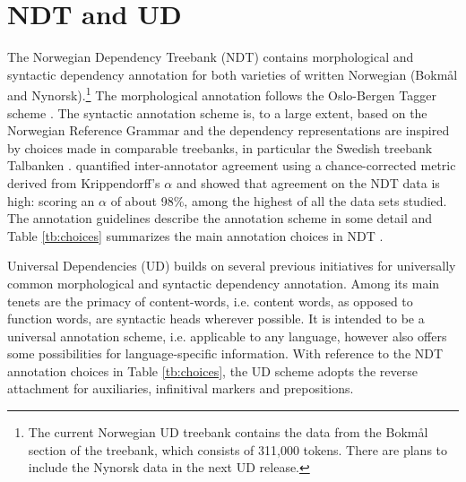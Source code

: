 \documentclass[10pt, a4paper]{article}
\begin{document}
\section{NDT and UD}
The Norwegian Dependency Treebank (NDT) \cite{Sol:Skj:Ovr:14} contains
morphological and syntactic dependency annotation for both varieties
of written Norwegian (Bokm{\aa}l and Nynorsk).\footnote{The current
  Norwegian UD treebank contains the data from the Bokmål section of
  the treebank, which consists of 311,000 tokens. There are plans to
  include the Nynorsk data in the next UD release.} The morphological
annotation follows the Oslo-Bergen Tagger scheme
\cite{Hag:Joh:Nok:00}.  The syntactic annotation scheme is, to a large
extent, based on the Norwegian Reference Grammar
\cite{Faa:Lie:Van:97} and the dependency representations are
inspired by choices made in comparable treebanks, in particular the
Swedish treebank Talbanken \cite{Niv:Nil:Hal:2006}.
 quantified inter-annotator agreement using a chance-corrected metric derived from
Krippendorff's $\alpha$ and showed that agreement on the NDT data is high: scoring an $\alpha$ of about
98\%, among the highest of all the data sets studied.
The annotation guidelines \cite{Kin:Sol:Eri:2013} describe the annotation scheme in some detail and Table \ref{tb:choices} summarizes the main annotation choices in NDT \cite{Sol:Skj:Ovr:14}.


Universal Dependencies (UD) builds on several previous initiatives for
universally common morphological \cite{Zem:08,Pet:Das:McD:12} and
syntactic dependency \cite{McD:Niv:Qui:13,Ros:Mas:Mar:14}
annotation. Among its main tenets are the primacy of content-words,
i.e. content words, as opposed to function words, are syntactic heads
wherever possible. It is intended to be a universal annotation scheme,
i.e. applicable to any language, however also offers some
possibilities for language-specific information. With reference to the
NDT annotation choices in Table \ref{tb:choices}, the UD scheme adopts
the reverse attachment for auxiliaries, infinitival markers and
prepositions.
\end{document}
